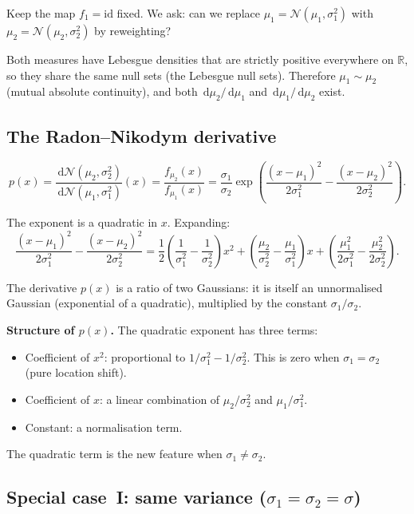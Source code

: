 \documentclass[11pt,a4paper]{article}
\newcommand{\N}{\mathcal{N}}
\newcommand{\dif}{\,\mathrm{d}}
\newcommand{\R}{\mathbb{R}}
\begin{document}
Keep the map $f_1=\mathrm{id}$ fixed.  We ask: can we replace
$\mu_1=\N(\mu_1,\sigma_1^2)$ with $\mu_2=\N(\mu_2,\sigma_2^2)$ by reweighting?

Both measures have Lebesgue densities that are strictly positive everywhere on $\R$, so they
share the same null sets (the Lebesgue null sets).  Therefore $\mu_1\sim\mu_2$ (mutual absolute
continuity), and both $\dif\mu_2/\dif\mu_1$ and $\dif\mu_1/\dif\mu_2$ exist.

\subsection{The Radon--Nikodym derivative}

\[
  p(x)
  =\frac{\dif\N(\mu_2,\sigma_2^2)}{\dif\N(\mu_1,\sigma_1^2)}(x)
  =\frac{f_{\mu_2}(x)}{f_{\mu_1}(x)}
  =\frac{\sigma_1}{\sigma_2}
    \exp\!\left(\frac{(x-\mu_1)^2}{2\sigma_1^2}-\frac{(x-\mu_2)^2}{2\sigma_2^2}\right).
\]

The exponent is a quadratic in $x$.  Expanding:
\begin{equation}\label{eq:Q}
  \frac{(x-\mu_1)^2}{2\sigma_1^2}-\frac{(x-\mu_2)^2}{2\sigma_2^2}
  =\frac{1}{2}\!\left(\frac{1}{\sigma_1^2}-\frac{1}{\sigma_2^2}\right)x^2
   +\left(\frac{\mu_2}{\sigma_2^2}-\frac{\mu_1}{\sigma_1^2}\right)x
   +\left(\frac{\mu_1^2}{2\sigma_1^2}-\frac{\mu_2^2}{2\sigma_2^2}\right).
   \tag{Q}
\end{equation}

The derivative $p(x)$ is a ratio of two Gaussians: it is itself an unnormalised Gaussian
(exponential of a quadratic), multiplied by the constant $\sigma_1/\sigma_2$.

\medskip\noindent\textbf{Structure of $p(x)$.}  The quadratic exponent has three terms:
\begin{itemize}
  \item Coefficient of $x^2$: proportional to $1/\sigma_1^2-1/\sigma_2^2$.
        This is zero when $\sigma_1=\sigma_2$ (pure location shift).
  \item Coefficient of $x$: a linear combination of $\mu_2/\sigma_2^2$ and $\mu_1/\sigma_1^2$.
  \item Constant: a normalisation term.
\end{itemize}
The quadratic term is the new feature when $\sigma_1\ne\sigma_2$.

\subsection{Special case~I: same variance ($\sigma_1=\sigma_2=\sigma$)}
\label{sec:normal-same-var}
\end{document}
